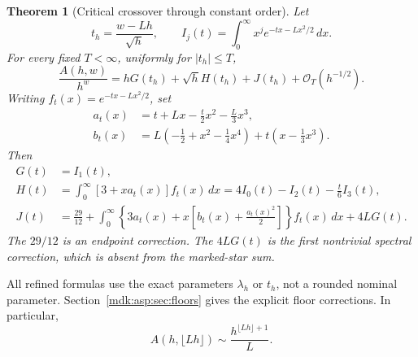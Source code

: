 \documentclass[11pt,letterpaper]{article}
\numberwithin{equation}{section}
\newtheorem{theorem}{Theorem}[section]
\theoremstyle{remark}\newtheorem{remark}[theorem]{Remark}
\newcommand{\Oh}{\mathcal O}\newcommand{\Q}{\mathbb Q}\newcommand{\N}{\mathbb N}\newcommand{\R}{\mathbb R}
\begin{document}
\begin{theorem}[Critical crossover through constant order]\label{mdk:asp:thm:critical}
Let
\[
t_h=\frac{w-Lh}{\sqrt h},\qquad I_j(t)=\int_0^\infty x^j e^{-tx-Lx^2/2}\,dx.
\]
For every fixed $T<\infty$, uniformly for $|t_h|\le T$,
\begin{equation}\label{mdk:asp:eq:critical}
\frac{A(h,w)}{h^w}=hG(t_h)+\sqrt h H(t_h)+J(t_h)+\Oh_T(h^{-1/2}).
\end{equation}
Writing $f_t(x)=e^{-tx-Lx^2/2}$, set
\begin{align}
a_t(x)&=t+Lx-\tfrac t2x^2-\tfrac L3x^3,\label{mdk:asp:eq:a}\\
b_t(x)&=L(-\tfrac12+x^2-\tfrac14x^4)+t(x-\tfrac13x^3).\label{mdk:asp:eq:b}
\end{align}
Then
\begin{align}
G(t)&=I_1(t),\label{mdk:asp:eq:G}\\
H(t)&=\int_0^\infty[3+xa_t(x)]f_t(x)\,dx
      =4I_0(t)-I_2(t)-\tfrac t6I_3(t),\label{mdk:asp:eq:H}\\
J(t)&=\frac{29}{12}+\int_0^\infty
 \left\{3a_t(x)+x\left[b_t(x)+\frac{a_t(x)^2}{2}\right]\right\}f_t(x)\,dx
 +4LG(t).\label{mdk:asp:eq:J}
\end{align}
The $29/12$ is an endpoint correction. The $4LG(t)$ is the first nontrivial spectral correction, which is absent from the marked-star sum.
\end{theorem}
All refined formulas use the exact parameters $\lambda_h$ or $t_h$, not a rounded nominal parameter. Section~\ref{mdk:asp:sec:floors} gives the explicit floor corrections. In particular,
\[
A(h,\lfloor Lh\rfloor)\sim\frac{h^{\lfloor Lh\rfloor+1}}{L}.
\]
\end{document}
